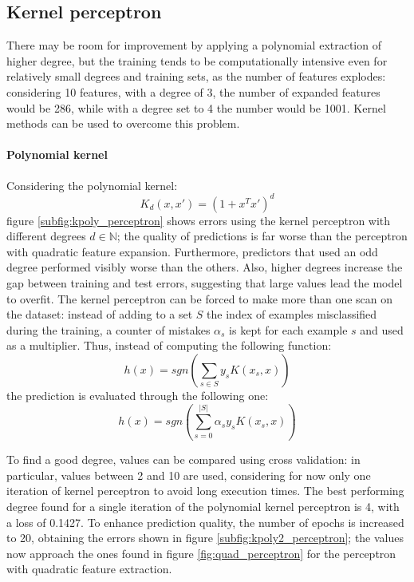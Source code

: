 \documentclass{article}
\begin{document}
\subsection{Kernel perceptron}
There may be room for improvement by applying a polynomial extraction of higher degree, but the training tends to be computationally intensive even for relatively small degrees and training sets, as the number of features explodes: considering 10 features, with a degree of 3, the number of expanded features would be 286, while with a degree set to 4 the number would be 1001. Kernel methods can be used to overcome this problem. 

\paragraph{Polynomial kernel}
Considering the polynomial kernel:
\begin{equation}
	K_d(x,x') = (1 + x^T x')^d
\end{equation}
figure \ref{subfig:kpoly_perceptron} shows errors using the kernel perceptron with different degrees $d\in \mathbb{N}$; the quality of predictions is far worse than the perceptron with quadratic feature expansion. Furthermore, predictors that used an odd degree performed visibly worse than the others. Also, higher degrees increase the gap between training and test errors, suggesting that large values lead the model to overfit. The kernel perceptron can be forced to make more than one scan on the dataset: instead of adding to a set $S$ the index of examples misclassified during the training, a counter of mistakes $\alpha_s$ is kept for each example $s$ and used as a multiplier. Thus, instead of computing the following function:
\begin{equation}
	h(x) = sgn\left(\sum_{s\in S} y_s K(x_s, x) \right)
\end{equation}
the prediction is evaluated through the following one:
\begin{equation}
	h(x) = sgn\left(\sum_{s=0}^{|S|} \alpha_s y_s K(x_s,x)\right)
\end{equation}

To find a good degree, values can be compared using cross validation: in particular, values between 2 and 10 are used, considering for now only one iteration of kernel perceptron to avoid long execution times. The best performing degree found for a single iteration of the polynomial kernel perceptron is 4, with a loss of 0.1427. To enhance prediction quality, the number of epochs is increased to 20, obtaining the errors shown in figure \ref{subfig:kpoly2_perceptron}; the values now approach the ones found in figure \ref{fig:quad_perceptron} for the perceptron with quadratic feature extraction.
\end{document}
